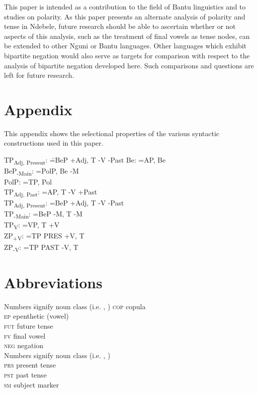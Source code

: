 \documentclass[output=paper]{langsci/langscibook}
\begin{document}
This paper is intended as a contribution to the field of Bantu linguistics and to studies on polarity. As this paper presents an alternate analysis of polarity and tense in Ndebele, future research should be able to ascertain whether or not aspects of this analysis, such as the treatment of final vowels as tense nodes, can be extended to other Nguni or Bantu languages. Other languages which exhibit bipartite negation would also serve as targets for comparison with respect to the analysis of bipartite negation developed here. Such comparisons and questions are left for future research. 
\vspace{5 mm}

\section*{Appendix}

This appendix shows the selectional properties of the various  syntactic constructions used in this paper.

\begin{multicols}{2}
\begin{tabbing}
TP\textsubscript{Adj, Present}: \= =BeP +Adj, T -V -Past\kill
Be: \> =AP, Be\\
BeP\textsubscript{-Main}: \> =PolP, Be -M\\
PolP: \> =TP, Pol\\
TP\textsubscript{Adj, Past}: \> =AP, T -V +Past\\
TP\textsubscript{Adj, Present}: \> =BeP +Adj, T -V -Past\\
TP\textsubscript{-Main}: \> =BeP -M, T -M\\
TP\textsubscript{V}: \> =VP, T +V\\
ZP\textsubscript{+V}: \> =TP PRES +V, T \\
ZP\textsubscript{-V}: \> =TP PAST -V, T \\

\end{tabbing}
\end{multicols}

\section*{Abbreviations}
\begin{multicols}{2}
\begin{tabbing}
Numbers \= signify noun class (i.e. , )\kill
\textsc{cop} \> copula\\
\textsc{ep} \> epenthetic (vowel)\\
\textsc{fut} \> future tense\\
\textsc{fv} \> final vowel\\
\textsc{neg} \> negation\\
Numbers \> signify noun class (i.e. , )\\
\textsc{prs} \> present tense\\
\textsc{pst} \> past tense\\
\textsc{sm} \> subject marker\\
\end{tabbing}
\end{multicols}


\printbibliography[heading=subbibliography,notkeyword=this]
\end{document}
